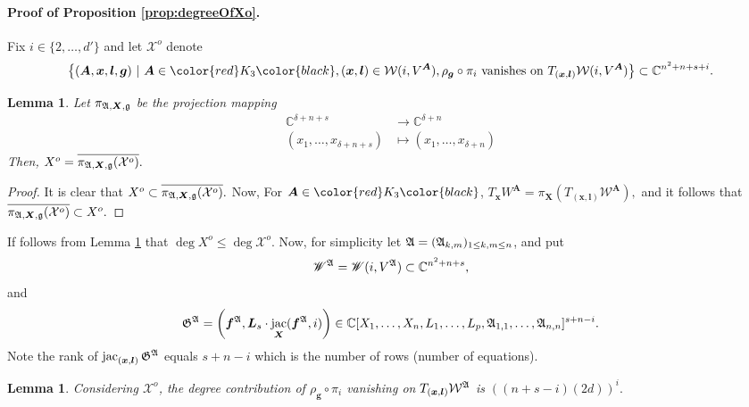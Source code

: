 \documentclass[12pt]{article}
\def\mA{{\bm A}}
\DeclareMathOperator{\jac}{jac}
\def\C{\mathbb{C}}
\newtheorem{lemma}[theorem]{Lemma}
\def\mA{{\bm A}}
\def\C{\mathbb{C}}
\begin{document}
\paragraph*{Proof of Proposition \ref{prop:degreeOfXo}.}
Fix $i \in \{2,\hdots,d'\}$ 
 and let $\mathcal{X}^o$ denote
\[
 \left\{ (\bm A,\bm x,\bm l, \bm g) ~|~ \bm A \in \color{red}K_3\color{black}, (\bm x, \bm l) \in \mathcal{W}(i,V^\mA), \rho_{\bm g} \circ \pi_i \textrm{ vanishes on } T_{(\bm x,\bm l)}\mathcal{W}(i,V^\mA) \right\} \subset \C^{n^2 + n + s + i}. 
\]
%
\begin{lemma}\label{lemma:XoAndLagXo} 
Let $\pi_{\frak{A},\bm X, \frak{g}}$ be the projection mapping
%
\begin{align*}
\C^{\delta + n + s} &\rightarrow \C^{\delta + n}\\    
(x_1,\hdots,x_{\delta + n+s}) &\mapsto (x_1,\hdots,x_{\delta+n})    
\end{align*}
%
Then, $X^o = \overline{\pi_{\frak{A},\bm X, \frak{g}}(\mathcal{X}^o)}.$
\end{lemma} 
%
%
\begin{proof}
It is clear that $X^o \subset \overline{\pi_{\frak{A},\bm X, \frak{g}}(\mathcal{X}^o)}.$ Now, For $\bm A \in \color{red} K_3\color{black}$, $T_{\bm x}W ^{\bm A} = \pi_{\bm X} \left( T_{(\bm x, \bm l)} \mathcal{W}^{\bm A}\right),$ and it follows that $\overline{\pi_{\frak{A},\bm X, \frak{g}}(\mathcal{X}^o)} \subset X^o.$
\end{proof}
%
\noindent
If follows from Lemma \ref{lemma:XoAndLagXo} that $\deg X^o \leq \deg \mathcal{X}^o.$ 
%
Now, for simplicity let $\frak{A} = (\frak{A}_{k,m})_{1 \le k,m \le n}$, and put
\[
\mathscr{W}^{\frak{A}} =\mathscr{W}(i,V^{\frak{A}}) \subset\C^{n^2+n+s}, 
\]
and 
\[
\frak{G}^{\frak{A}} = \left(\bm f^{\frak{A}},\bm L_s\cdot \jac_{\bm X}(\bm f^{\frak{A}},i) \right) \in \C[X_1,\hdots,X_n, L_1,\hdots,L_p, \frak{A}_{1,1},\hdots,\frak{A}_{n,n}]^{s+n-i}.
\]
Note the rank of $\jac_{(\bm x, \bm l)}\frak{G}^{\frak{A}}$ equals $s + n-i$
which is the number of rows (number of equations).
%
\begin{lemma}
Considering $\mathcal{X}^o$, the degree contribution of $\rho_{\bm g} \circ \pi_i$ vanishing on  $T_{(\bm x,\bm l)}\mathcal{W}^{\frak{A}}$ is $\left((n+s-i)(2d)\right)^i.$
%
\end{lemma}
%
\end{document}

